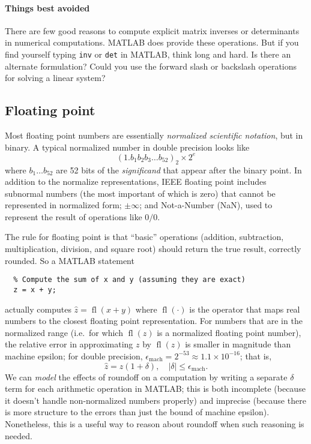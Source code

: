 \documentclass[12pt, leqno]{article}
\begin{document}
\paragraph{Things best avoided}
There are few good reasons to compute explicit matrix inverses or
determinants in numerical computations.  MATLAB does provide these
operations.  But if you find yourself typing {\tt inv} or {\tt det} in
MATLAB, think long and hard.  Is there an alternate formulation?
Could you use the forward slash or backslash operations for solving a
linear system?

\subsection{Floating point}
Most floating point numbers are essentially
{\em normalized scientific notation}, but in binary.
A typical normalized number in double precision looks like
\[
  (1.b_1 b_2 b_3 \ldots b_{52})_2 \times 2^{e}
\]
where $b_1 \ldots b_{52}$ are 52 bits of the {\em significand}
that appear after the binary point.  In addition to the normalize
representations, IEEE floating point includes subnormal numbers
(the most important of which is zero) that cannot be represented
in normalized form; $\pm \infty$; and Not-a-Number (NaN), used
to represent the result of operations like $0/0$.

The rule for floating point is that ``basic'' operations
(addition, subtraction, multiplication, division, and square root)
should return the true result, correctly rounded.  So a MATLAB
statement
\begin{lstlisting}
  % Compute the sum of x and y (assuming they are exact)
  z = x + y;
\end{lstlisting}
actually computes $\hat{z} = \operatorname{fl}(x+y)$ where
$\operatorname{fl}(\cdot)$ is the operator that maps real numbers to
the closest floating point representation.  For numbers that are in
the normalized range (i.e.~for which $\operatorname{fl}(z)$ is a
normalized floating point number), the relative error in approximating
$z$ by $\operatorname{fl}(z)$ is smaller in magnitude than machine
epsilon; for double precision, $\epsilon_{\mathrm{mach}} = 2^{-53}
\approx 1.1 \times 10^{-16}$; that is,
\[
  \hat{z} = z(1+\delta), \quad |\delta| \leq \epsilon_{\mathrm{mach}}.
\]
We can {\em model} the effects of roundoff on a computation by writing
a separate $\delta$ term for each arithmetic operation in MATLAB;
this is both incomplete (because it doesn't handle non-normalized
numbers properly) and imprecise (because there is more structure to
the errors than just the bound of machine epsilon).  Nonetheless,
this is a useful way to reason about roundoff when such reasoning
is needed.
\end{document}
